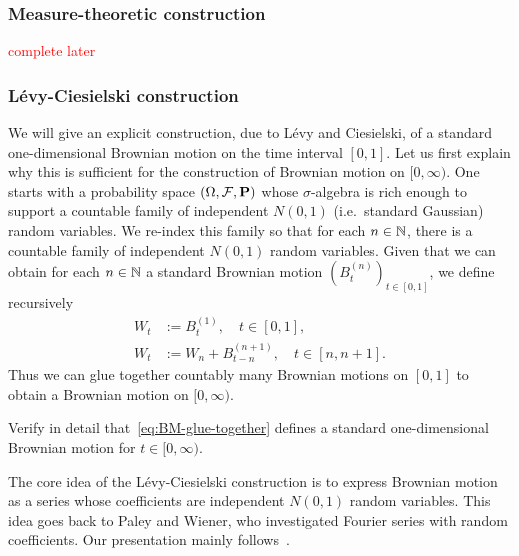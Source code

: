 \subsubsection*{Measure-theoretic construction}
\textcolor{red}{complete later}

\subsubsection*{L\'{e}vy-Ciesielski construction}
We will give an explicit construction, due to L\'{e}vy and Ciesielski, of a standard one-dimensional Brownian motion on the time interval $[0, 1]$. Let us first explain why this is sufficient for the construction of Brownian motion on $[0,\infty)$. One starts with a probability space $(\Omega,\mathcal{F},\mathbf{P})$ whose $\sigma$-algebra is rich enough to support a countable family of independent $N(0,1)$ (i.e.\ standard Gaussian) random variables. We re-index this family so that for each $n\in\mathbb{N}$, there is a countable family of independent $N(0,1)$ random variables. Given that we can obtain for each $n\in\mathbb{N}$ a standard Brownian motion $(B^{(n)}_t)_{t\in [0,1]}$, we define recursively
\begin{equation}
\label{eq:BM-glue-together}
\begin{aligned}
    W_t &:= B^{(1)}_t, \quad t\in [0,1], \\
    W_t &:= W_n + B^{(n+1)}_{t-n}, \quad t\in [n,n+1].
\end{aligned}
\end{equation}
Thus we can glue together countably many Brownian motions on $[0,1]$ to obtain a Brownian motion on $[0,\infty)$.
\begin{exercise}
    Verify in detail that~\eqref{eq:BM-glue-together} defines a standard one-dimensional Brownian motion for $t\in [0,\infty)$.
\end{exercise}

The core idea of the L\'{e}vy-Ciesielski construction is to express Brownian motion as a series whose coefficients are independent $N(0,1)$ random variables. This idea goes back to Paley and Wiener, who investigated Fourier series with random coefficients. Our presentation mainly follows~\cite[Section 3.3]{EvSDE}.

